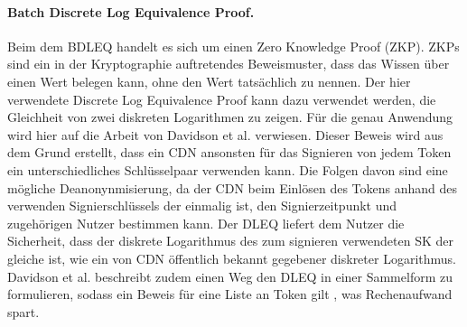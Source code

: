 \documentclass[
	fontsize=11pt,
	headings=small,
	parskip=half,           %
	bibliography=totoc,
	numbers=noenddot,       %
	open=any,               %
]{scrreprt}
\begin{document}
\paragraph{Batch Discrete Log Equivalence Proof.}
Beim dem BDLEQ handelt es sich um einen Zero Knowledge Proof (ZKP). ZKPs sind ein in der Kryptographie auftretendes Beweismuster, dass das Wissen über einen Wert belegen kann, ohne den Wert tatsächlich zu nennen. Der hier verwendete Discrete Log Equivalence Proof kann dazu verwendet werden, die Gleichheit von zwei diskreten Logarithmen zu zeigen. Für die genau Anwendung wird hier auf die Arbeit von Davidson et al. \cite{pp-davidson2018privacy} verwiesen. Dieser Beweis wird aus dem Grund erstellt, dass ein CDN ansonsten für das Signieren von jedem Token ein unterschiedliches Schlüsselpaar verwenden kann. Die Folgen davon sind eine mögliche Deanonynmisierung, da der CDN beim Einlösen des Tokens anhand des verwenden Signierschlüssels der einmalig ist, den Signierzeitpunkt und zugehörigen Nutzer bestimmen kann. Der DLEQ liefert dem Nutzer die Sicherheit, dass der diskrete Logarithmus des zum signieren verwendeten SK der gleiche ist, wie ein von CDN öffentlich bekannt gegebener diskreter Logarithmus. Davidson et al. beschreibt zudem einen Weg den DLEQ in einer Sammelform zu formulieren, sodass ein Beweis für eine Liste an Token gilt \cite{pp-davidson2018privacy}, was Rechenaufwand spart.
\end{document}
